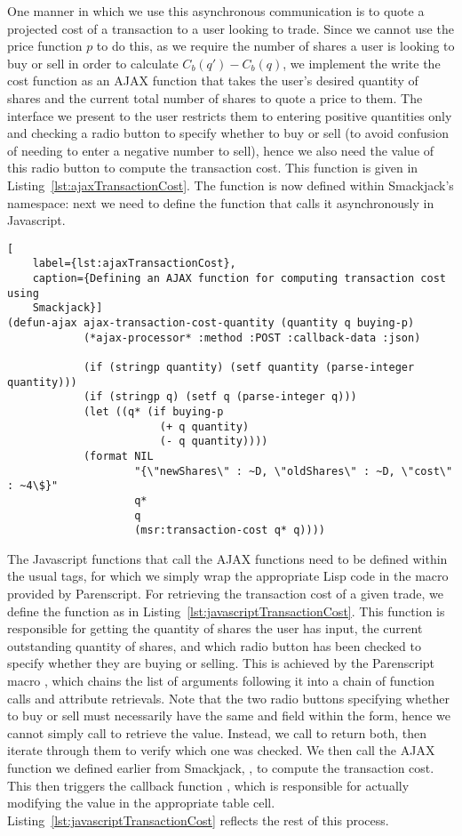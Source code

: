 One manner in which we use this asynchronous communication is to quote a
projected cost of a transaction to a user looking to trade. Since we cannot use
the price function $p$ to do this, as we require the number of shares a user is
looking to buy or sell in order to calculate $C_b(q')-C_b(q)$, we implement the
write the cost function as an AJAX function that takes the user's desired
quantity of shares and the current total number of shares to quote a price to
them. The interface we present to the user restricts them to entering positive
quantities only and checking a radio button to specify whether to buy or sell
(to avoid confusion of needing to enter a negative number to sell), hence we
also need the value of this radio button to compute the transaction cost. This
function is given in Listing~\ref{lst:ajaxTransactionCost}. The function is now
defined within Smackjack's namespace: next we need to define the function that
calls it asynchronously in Javascript.

\begin{lstlisting}[
	label={lst:ajaxTransactionCost},
	caption={Defining an AJAX function for computing transaction cost using
	Smackjack}]
(defun-ajax ajax-transaction-cost-quantity (quantity q buying-p)
			(*ajax-processor* :method :POST :callback-data :json)

			(if (stringp quantity) (setf quantity (parse-integer quantity)))
			(if (stringp q) (setf q (parse-integer q)))
			(let ((q* (if buying-p
						(+ q quantity)
						(- q quantity))))
			(format NIL 
					"{\"newShares\" : ~D, \"oldShares\" : ~D, \"cost\" : ~4\$}"
					q*
					q
					(msr:transaction-cost q* q))))
\end{lstlisting}

The Javascript functions that call the AJAX functions need to be defined within
the usual  tags, for which we simply wrap the appropriate Lisp
code in the  macro provided by Parenscript. For retrieving
the transaction cost of a given trade, we define the function
 as in
Listing~\ref{lst:javascriptTransactionCost}. This function is responsible for
getting the quantity of shares the user has input, the current outstanding
quantity of shares, and which radio button has been checked to specify whether
they are buying or selling. This is achieved by the Parenscript macro
, which chains the list of arguments following it into a chain of
function calls and attribute retrievals. Note that the two radio buttons
specifying whether to buy or sell must necessarily have the same  and
 field within the form, hence we cannot simply call
 to retrieve the value. Instead, we call
 to return both, then iterate through them to verify
which one was checked. We then call the AJAX function we defined earlier from
Smackjack, , to compute the transaction
cost. This then triggers the callback function ,
which is responsible for actually modifying the value in the appropriate table
cell. Listing~\ref{lst:javascriptTransactionCost} reflects the rest of this
process.

